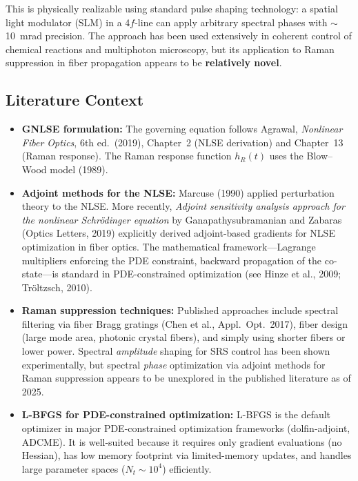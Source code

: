 \documentclass[12pt,a4paper]{article}
\theoremstyle{definition}
\begin{document}
This is physically realizable using standard pulse shaping technology: a spatial light modulator (SLM) in a 4$f$-line can apply arbitrary spectral phases with $\sim$10~mrad precision. The approach has been used extensively in coherent control of chemical reactions and multiphoton microscopy, but its application to Raman suppression in fiber propagation appears to be \textbf{relatively novel}.

\subsection{Literature Context}

\begin{itemize}[leftmargin=*]
\item \textbf{GNLSE formulation:} The governing equation follows Agrawal, \emph{Nonlinear Fiber Optics}, 6th ed.\ (2019), Chapter~2 (NLSE derivation) and Chapter~13 (Raman response). The Raman response function $h_R(t)$ uses the Blow--Wood model (1989).

\item \textbf{Adjoint methods for the NLSE:} Marcuse (1990) applied perturbation theory to the NLSE. More recently, \emph{Adjoint sensitivity analysis approach for the nonlinear Schr\"odinger equation} by Ganapathysubramanian and Zabaras (Optics Letters, 2019) explicitly derived adjoint-based gradients for NLSE optimization in fiber optics. The mathematical framework---Lagrange multipliers enforcing the PDE constraint, backward propagation of the co-state---is standard in PDE-constrained optimization (see Hinze et al., 2009; Tr\"oltzsch, 2010).

\item \textbf{Raman suppression techniques:} Published approaches include spectral filtering via fiber Bragg gratings (Chen et al., Appl.\ Opt.\ 2017), fiber design (large mode area, photonic crystal fibers), and simply using shorter fibers or lower power. Spectral \emph{amplitude} shaping for SRS control has been shown experimentally, but spectral \emph{phase} optimization via adjoint methods for Raman suppression appears to be unexplored in the published literature as of 2025.

\item \textbf{L-BFGS for PDE-constrained optimization:} L-BFGS is the default optimizer in major PDE-constrained optimization frameworks (dolfin-adjoint, ADCME). It is well-suited because it requires only gradient evaluations (no Hessian), has low memory footprint via limited-memory updates, and handles large parameter spaces ($N_t \sim 10^4$) efficiently.
\end{itemize}
\end{document}
